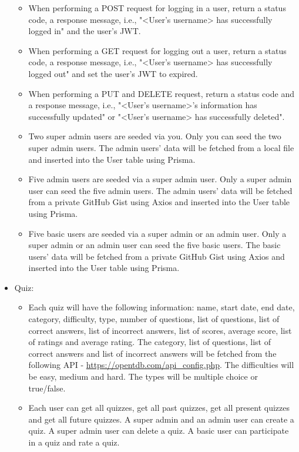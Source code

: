 \documentclass{article}
\begin{document}
\begin{itemize}
\begin{itemize}
		\item When performing a POST request for logging in a user, return a status code, a response message, i.e., "<User's username> has successfully logged in" and the user's JWT.
		\item When performing a GET request for logging out a user, return a status code, a response message, i.e., "<User's username> has successfully logged out" and set the user's JWT to expired.
		\item When performing a PUT and DELETE request, return a status code and a response message, i.e., "<User's username>'s information has successfully updated" or "<User's username> has successfully deleted".
		\item Two super admin users are seeded via you. Only you can seed the two super admin users. The admin users' data will be fetched from a local file and inserted into the User table using Prisma. 
		\item Five admin users are seeded via a super admin user. Only a super admin user can seed the five admin users. The admin users' data will be fetched from a private GitHub Gist using Axios and inserted into the User table using Prisma.  
		\item Five basic users are seeded via a super admin or an admin user. Only a super admin or an admin user can seed the five basic users. The basic users' data will be fetched from a private GitHub Gist using Axios and inserted into the User table using Prisma. 
	\end{itemize} 
	\item Quiz:
	\begin{itemize}
		\item Each quiz will have the following information: name, start date, end date, category, difficulty, type, number of questions, list of questions, list of correct answers, list of incorrect answers, list of scores, average score, list of ratings and average rating. The category, list of questions, list of correct answers and list of incorrect answers will be fetched from the following API - \href{https://opentdb.com/api\_config.php}{https://opentdb.com/api\_config.php}. The difficulties will be easy, medium and hard. The types will be multiple choice or true/false.
		\item Each user can get all quizzes, get all past quizzes, get all present quizzes and get all future quizzes. A super admin and an admin user can create a quiz. A super admin user can delete a quiz. A basic user can participate in a quiz and rate a quiz.

\end{itemize}
\end{itemize}
\end{document}
